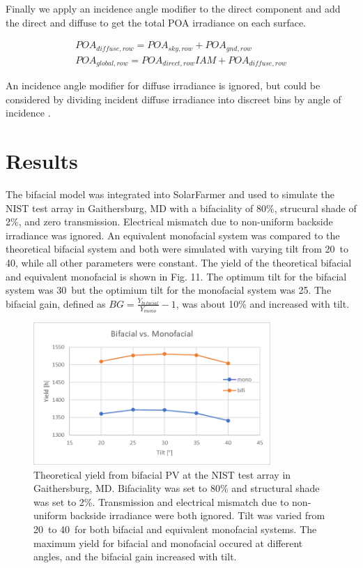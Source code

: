 \documentclass[conference]{IEEEtran}
\begin{document}
Finally we apply an incidence angle modifier to the direct component and add the direct and diffuse to get the total POA irradiance on each surface.

\begin{align}
POA_{diffuse,row} = POA_{sky,row} + POA_{gnd,row}\\
POA_{global,row} = POA_{direct,row}IAM + POA_{diffuse,row}
\end{align}

An incidence angle modifier for diffuse irradiance is ignored, but could be considered by dividing incident diffuse irradiance into discreet bins by angle of incidence \cite{Marion2017}.

\section{Results}
The bifacial model was integrated into SolarFarmer and used to simulate the NIST test array in Gaithersburg, MD \cite{Mikofski_8547323} with a bifaciality of 80\%, strucural shade of 2\%, and zero transmission.  Electrical mismatch due to non-uniform backside irradiance was ignored.  An equivalent monofacial system was compared to the theoretical bifacial system and both were simulated with varying tilt from 20\degree\ to 40\degree, while all other parameters were constant.  The yield of the theoretical bifacial and equivalent monofacial is shown in Fig. 11.  The optimum tilt for the bifacial system was 30\degree\ but the optimium tilt for the monofacial system was 25\degree.  The bifacial gain, defined as $BG=\frac{Y_{bifacial}}{Y_{mono}}-1$, was about 10\% and increased with tilt.

\begin{figure}
\centering
\includegraphics[width=9cm]{NIST_bifi-v-mono.png}
\caption{Theoretical yield from bifacial PV at the NIST test array in Gaithersburg, MD.  Bifaciality was set to 80\% and structural shade was set to 2\%.  Transmission and electrical mismatch due to non-uniform backside irradiance were both ignored.  Tilt was varied from 20\degree\ to 40\degree\ for both bifacial and equivalent monofacial systems.  The maximum yield for bifacial and monofacial occured at different angles, and the bifacial gain increased with tilt.}
\end{figure}
\end{document}
